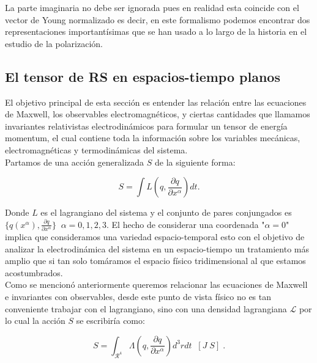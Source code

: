         La parte imaginaria no debe ser ignorada pues en realidad esta coincide con el vector de Young normalizado es decir, en este formalismo podemos encontrar dos representaciones importantísimas que se han usado a lo largo de la historia en el estudio de la polarización.
        
        \subsection{El tensor de RS en espacios-tiempo planos}

        El objetivo principal de esta sección es entender las relación entre las ecuaciones de Maxwell, los observables electromagnéticos, y ciertas cantidades que llamamos invariantes relativistas electrodinámicos para formular un tensor de energía momentum, el cual contiene toda la información sobre los variables mecánicas, electromagnéticas y termodinámicas del sistema.\\

        Partamos de una acción generalizada $S$ de la siguiente forma:
        
        \begin{equation}
            S = \int L\left(q,\frac{\partial q}{\partial x^{\alpha}}\right)dt .
        \end{equation}

        Donde $L$ es el lagrangiano del sistema y el conjunto de pares conjungados es $\{q(x^{\alpha}) , \frac{\partial q}{\partial x^{\alpha}}\}\;\; \alpha = 0,1,2,3$. El hecho de considerar una coordenada "$\alpha = 0$" implica que consideramos una variedad espacio-temporal esto con el objetivo de analizar la electrodinámica del sistema en un espacio-tiempo un tratamiento más amplio que si tan solo tomáramos el espacio físico tridimensional al que estamos acostumbrados. \\

        Como se mencionó anteriormente queremos relacionar las ecuaciones de Maxwell e invariantes con observables, desde este punto de vista físico no es tan conveniente trabajar con el lagrangiano, sino con una densidad lagrangiana $\mathcal{L}$ por lo cual la acción $S$ se escribiría como:

        \begin{equation}
            S = \int_{\mathcal{R}^4}\Lambda \left(q , \frac{\partial q}{\partial x^{\alpha}} \right)d^3rdt \;\;[J\;S] \;.
        \end{equation}

